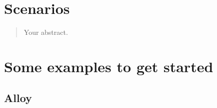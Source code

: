 \documentclass[a4paper]{article}
\begin{document}

\newpage

\section{Scenarios}


\begin{abstract}
Your abstract.
\end{abstract}

\section{Some examples to get started}

\subsection{Alloy}

\end{document}

